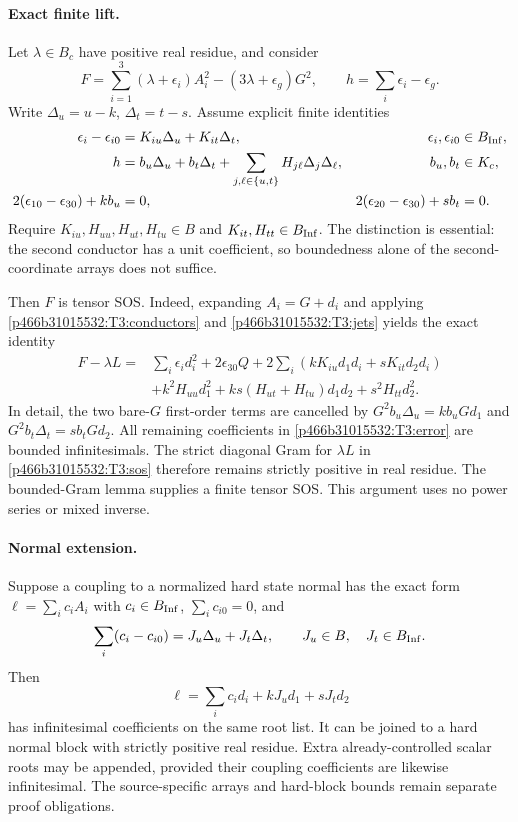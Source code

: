 \paragraph{Exact finite lift.}
Let $\lambda\in B_c$ have positive real residue, and consider
\[
 F=\sum_{i=1}^3(\lambda+\epsilon_i)A_i^2
       -(3\lambda+\epsilon_g)G^2,
 \qquad h=\sum_i\epsilon_i-\epsilon_g.
\]
Write $\Delta_u=u-k$, $\Delta_t=t-s$. Assume explicit finite identities
\begin{align}
 \epsilon_i-\epsilon_{i0}&=K_{iu}\Delta_u+K_{it}\Delta_t,
       &\epsilon_i,\epsilon_{i0}&\in B_{\rm Inf},\label{p466b31015532:T3:coeff}\\
 h&=b_u\Delta_u+b_t\Delta_t+
          \sum_{j,\ell\in\{u,t\}}H_{j\ell}\Delta_j\Delta_\ell,
       &b_u,b_t&\in K_c,\label{p466b31015532:T3:taylor}\\
 2(\epsilon_{10}-\epsilon_{30})+k b_u&=0,
 &2(\epsilon_{20}-\epsilon_{30})+s b_t&=0.\label{p466b31015532:T3:jets}
\end{align}
Require $K_{iu},H_{uu},H_{ut},H_{tu}\in B$ and
$K_{it},H_{tt}\in B_{\rm Inf}$. The distinction is essential:
the second conductor has a unit coefficient, so boundedness alone of
the second-coordinate arrays does not suffice.

Then $F$ is tensor SOS. Indeed, expanding $A_i=G+d_i$ and applying
\eqref{p466b31015532:T3:conductors} and \eqref{p466b31015532:T3:jets} yields the exact identity
\begin{align}\label{p466b31015532:T3:error}
 F-\lambda L={}&\sum_i\epsilon_i d_i^2+2\epsilon_{30}Q
 +2\sum_i(kK_{iu}d_1d_i+sK_{it}d_2d_i)\\
 &+k^2H_{uu}d_1^2+ks(H_{ut}+H_{tu})d_1d_2
          +s^2H_{tt}d_2^2.\nonumber
\end{align}
In detail, the two bare-$G$ first-order terms are cancelled by
$G^2b_u\Delta_u=kb_uGd_1$ and
$G^2b_t\Delta_t=sb_tGd_2$. All remaining coefficients in
\eqref{p466b31015532:T3:error} are bounded infinitesimals. The strict diagonal
Gram for $\lambda L$ in \eqref{p466b31015532:T3:sos} therefore remains strictly
positive in real residue. The bounded-Gram lemma supplies a finite
tensor SOS. This argument uses no power series or mixed inverse.

\paragraph{Normal extension.}
Suppose a coupling to a normalized hard state normal has the exact form
$\ell=\sum_i c_iA_i$ with $c_i\in B_{\rm Inf}$,
$\sum_i c_{i0}=0$, and
\[
 \sum_i(c_i-c_{i0})=J_u\Delta_u+J_t\Delta_t,
 \qquad J_u\in B,\quad J_t\in B_{\rm Inf}.
\]
Then
\[
 \ell=\sum_i c_i d_i+kJ_u d_1+sJ_t d_2
\]
has infinitesimal coefficients on the same root list. It can be joined
to a hard normal block with strictly positive real residue. Extra
already-controlled scalar roots may be appended, provided their
coupling coefficients are likewise infinitesimal. The source-specific
arrays and hard-block bounds remain separate proof obligations.

